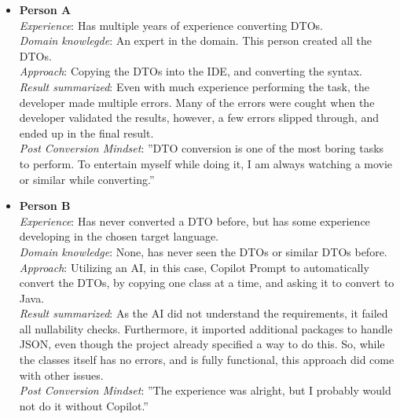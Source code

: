\begin{itemize}
    
    \item \textbf{Person A} \\ %
    \textit{Experience}: Has multiple years of experience converting DTOs. \\
    \textit{Domain knowlegde}: An expert in the domain. This person created all the DTOs. \\
    \textit{Approach}: Copying the DTOs into the IDE, and converting the syntax. \\
    \textit{Result summarized}: Even with much experience performing the task, the developer made multiple errors. Many of the errors were cought when the developer validated the results, however, a few errors slipped through, and ended up in the final result.\\
    \textit{Post Conversion Mindset}: ''DTO conversion is one of the most boring tasks to perform. To entertain myself while doing it, I am always watching a movie or similar while converting.''
    
    \item \textbf{Person B} \\ %
    \textit{Experience}: Has never converted a DTO before, but has some experience developing in the chosen target language. \\
    \textit{Domain knowledge}: None, has never seen the DTOs or similar DTOs before. \\
    \textit{Approach}: Utilizing an AI, in this case, Copilot Prompt to automatically convert the DTOs, by copying one class at a time, and asking it to convert to Java. \\
    \textit{Result summarized}: As the AI did not understand the requirements, it failed all nullability checks. Furthermore, it imported additional packages to handle JSON, even though the project already specified a way to do this. So, while the classes itself has no errors, and is fully functional, this approach did come with other issues.\\
    \textit{Post Conversion Mindset}: ''The experience was alright, but I probably would not do it without Copilot.''
    

\end{itemize}
